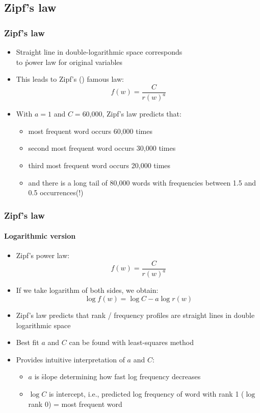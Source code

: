 \documentclass[handout,notes=show,t]{beamer} %
\begin{document}
\subsection{Zipf's law}

\begin{frame}
  \frametitle{Zipf's law}

\begin{itemize}
\item Straight line in double-logarithmic space corresponds\\
  to \h{power law} for original variables
\item This leads to Zipf's (\citeyear{Zipf:49,Zipf:65}) famous law:
    \[
    f(w)=\frac{C}{r(w)^a}
    \]
    \pause
  \item With $a=1$ and $C=$60,000, Zipf's law predicts that:
    \begin{itemize}
    \item most frequent word occurs 60,000 times
    \item second most frequent word occurs 30,000 times
    \item third most frequent word occurs 20,000 times
    \item and there is a long tail of 80,000 words with frequencies between
      1.5 and 0.5 occurrences(!)
    \end{itemize}
  \end{itemize}

\end{frame}

\begin{frame}
  \frametitle{Zipf's law}\framesubtitle{Logarithmic version}

  \begin{itemize}
  \item Zipf's power law:
    \[
    f(w)=\frac{C}{r(w)^a}
    \]
  \item If we take logarithm of both sides, we obtain:
    \[
    \log f(w)= \log C - a \log r(w)
    \]
  \item Zipf's law predicts that rank / frequency profiles are
    straight lines in double logarithmic space
  \item Best fit $a$ and $C$ can be found with least-squares
    method%
    \pause
  \item Provides intuitive interpretation of $a$ and $C$:
    \begin{itemize}
    \item $a$ is \h{slope} determining how fast log frequency decreases
    \item $\log C$ is \h{intercept}, i.e., predicted log frequency of word
      with rank 1 ($\log$ rank 0) = most frequent word
    \end{itemize}
  \end{itemize}
\end{frame}
\end{document}
